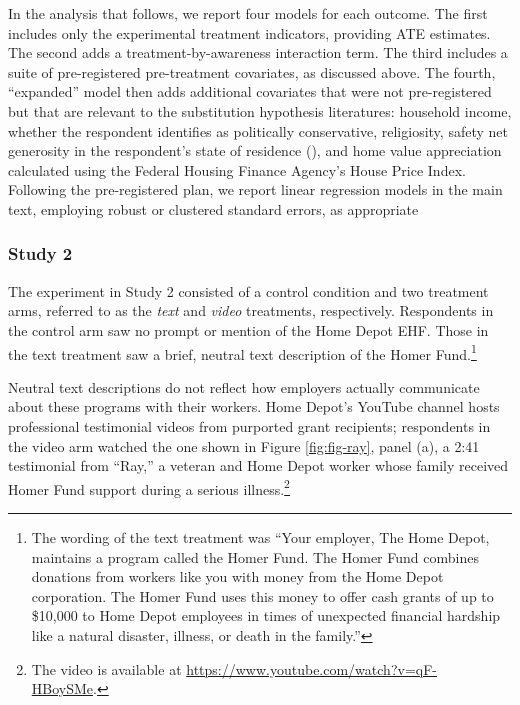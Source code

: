 \documentclass[
  11pt,
  oneside]{article}
\begin{document}
In the analysis that follows, we report four models for each outcome. The first includes only the experimental treatment indicators, providing ATE estimates. The second adds a treatment-by-awareness interaction term. The third includes a suite of pre-registered pre-treatment covariates, as discussed above. The fourth, ``expanded'' model then adds additional covariates that were not pre-registered but that are relevant to the substitution hypothesis literatures: household income, whether the respondent identifies as politically conservative, religiosity, safety net generosity in the respondent's state of residence (), and home value appreciation calculated using the Federal Housing Finance Agency's House Price Index. Following the pre-registered plan, we report linear regression models in the main text, employing robust or clustered standard errors, as appropriate

\subsubsection{Study 2}\label{study-2}

The experiment in Study 2 consisted of a control condition and two treatment arms, referred to as the \emph{text} and \emph{video} treatments, respectively. Respondents in the control arm saw no prompt or mention of the Home Depot EHF. Those in the text treatment saw a brief, neutral text description of the Homer Fund.\footnote{The wording of the text treatment was ``Your employer, The Home Depot, maintains a program called the Homer Fund. The Homer Fund combines donations from workers like you with money from the Home Depot corporation. The Homer Fund uses this money to offer cash grants of up to \$10,000 to Home Depot employees in times of unexpected financial hardship like a natural disaster, illness, or death in the family.''}

Neutral text descriptions do not reflect how employers actually communicate about these programs with their workers. Home Depot's YouTube channel hosts professional testimonial videos from purported grant recipients; respondents in the video arm watched the one shown in Figure \ref{fig:fig-ray}, panel (a), a 2:41 testimonial from ``Ray,'' a veteran and Home Depot worker whose family received Homer Fund support during a serious illness.\footnote{The video is available at \url{https://www.youtube.com/watch?v=qF-HBoySMe}.}
\end{document}
